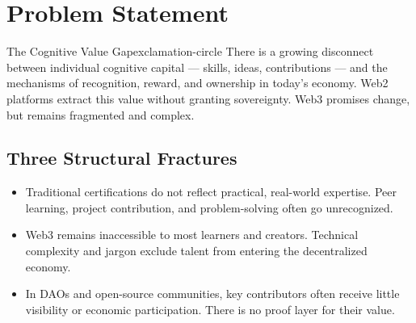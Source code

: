 \section{Problem Statement}

\begin{mfai-box}{The Cognitive Value Gap}{exclamation-circle}
There is a growing disconnect between individual cognitive capital — skills, ideas, contributions — and the mechanisms of recognition, reward, and ownership in today's economy. Web2 platforms extract this value without granting sovereignty. Web3 promises change, but remains fragmented and complex.
\end{mfai-box}

\vspace{1em}

\subsection*{Three Structural Fractures}

\begin{itemize}
  \item {} Traditional certifications do not reflect practical, real-world expertise. Peer learning, project contribution, and problem-solving often go unrecognized.
  \item {} Web3 remains inaccessible to most learners and creators. Technical complexity and jargon exclude talent from entering the decentralized economy.
  \item {} In DAOs and open-source communities, key contributors often receive little visibility or economic participation. There is no proof layer for their value.
\end{itemize}

\vspace{1.5em}

\begin{center}
\end{center}

